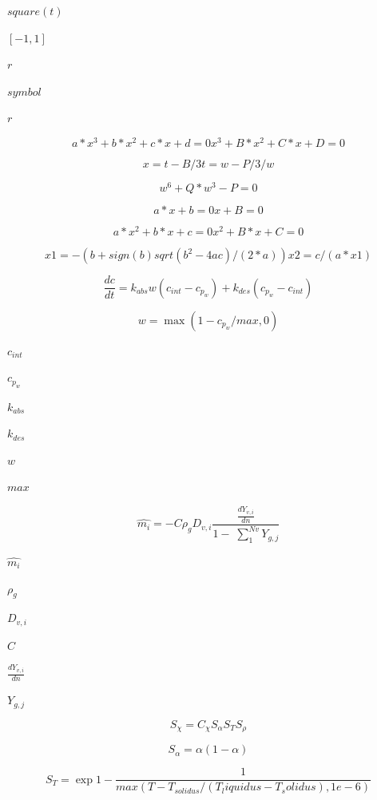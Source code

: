 \documentclass{article}
\begin{document}
$ square(t) $
\pagebreak

$ [-1, 1] $
\pagebreak

$ r $
\pagebreak

$        symbol  $
\pagebreak

$        r       $
\pagebreak

\[
    a*x^3 + b*x^2 + c*x + d = 0
      x^3 + B*x^2 + C*x + D = 0
\]
\pagebreak

\[
    x = t - B/3
    t = w - P/3/w
\]
\pagebreak

\[
    w^6 + Q*w^3 - P = 0
\]
\pagebreak

\[
    a*x + b = 0
      x + B = 0
\]
\pagebreak

\[
    a*x^2 + b*x + c = 0
      x^2 + B*x + C = 0
\]
\pagebreak

\[
    x1 = - (b + sign(b) sqrt(b^2 - 4ac)/(2*a))

    x2 = c/(a*x1)
\]
\pagebreak

\[
    \frac{d c}{d t} =
        k_{abs} w (c_{int} - c_{p_{w}}) + k_{des} (c_{p_{w}} - c_{int})
\]
\pagebreak

\[
    w = \max(1 - c_{p_{w}}/max, 0)
\]
\pagebreak

$      c_{int}      $
\pagebreak

$      c_{p_{w}}    $
\pagebreak

$      k_{abs}      $
\pagebreak

$      k_{des}      $
\pagebreak

$      w            $
\pagebreak

$      max          $
\pagebreak

\[
    \hat{m_i} =
        - C \rho_{g} D_{v,i}
        \frac
        {
            \frac{dY_{v,i}}{dn}
        }
        {
            1 - \; \sum_{1}^{Nv}Y_{g,j}
        }
\]
\pagebreak

$        \hat{m_i}           $
\pagebreak

$        \rho_{g}            $
\pagebreak

$        D_{v,i}             $
\pagebreak

$        C                   $
\pagebreak

$        \frac{dY_{v,i}}{dn} $
\pagebreak

$        Y_{g,j}             $
\pagebreak

\[
    S_\chi = C_\chi S_\alpha S_T S_\rho
\]
\pagebreak

\[
    S_\alpha = \alpha (1 - \alpha)
\]
\pagebreak

\[
    S_T =
    \exp{
        1 - \frac{1}{max(T - T_{solidus}/(T_liquidus - T_solidus), 1e-6)}
    }
\]
\pagebreak
\end{document}
